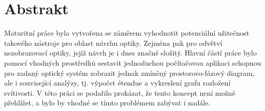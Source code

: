 \chapter*{Abstrakt}

Maturitní práce \textit{\thetitle} byla vytvořena se záměrem vyhodnotit potenciální užitečnost takového nástroje pro oblast návrhu optiky. Zejména pak pro odvětví nezobrazovací optiky, jejíž návrh je i dnes značně složitý. Hlavní částí práce bylo pomocí vhodných prostředků sestavit jednoduchou počítačovou aplikaci schopnou pro zadaný optický systém zobrazit jednak zmíněný prostorovo-fázový diagram, ale i související analýzy, tj. výpočet étendue a vykreslení grafu rozložení svítivosti. V této práci se podařilo prokázat, že tento koncept není možné přehlížet, a bylo by vhodné se tímto problémem zabývat i nadále.
